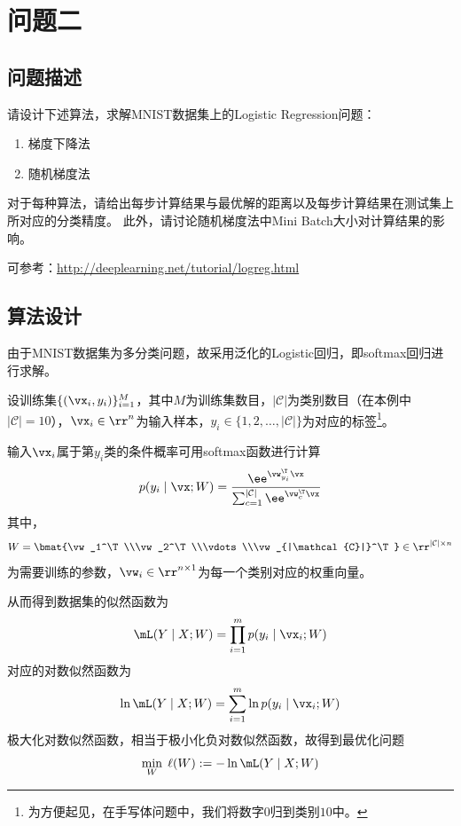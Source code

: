 \documentclass[logo,reportComp]{thesis}
\begin{document}
\section{问题二}
\subsection{问题描述}
请设计下述算法，求解MNIST数据集上的Logistic Regression问题：
\begin{enumerate}
    \item 梯度下降法
    \item 随机梯度法
\end{enumerate}

对于每种算法，请给出每步计算结果与最优解的距离以及每步计算结果在测试集上所对应的分类精度。
此外，请讨论随机梯度法中Mini Batch大小对计算结果的影响。

可参考：\url{http://deeplearning.net/tutorial/logreg.html}


\subsection{算法设计}
由于MNIST数据集为多分类问题，故采用泛化的Logistic回归，即softmax回归进行求解。

设训练集$\{(\vx_i,y_i)\}_{i=1}^M$，其中$M$为训练集数目，${|\mathcal{C}|}$为类别数目（在本例中${|\mathcal{C}|}=10$），$\vx_i\in\rr^n$为输入样本，$y_i\in\{1,2,\ldots,{|\mathcal{C}|}\}$为对应的标签\footnote{为方便起见，在手写体问题中，我们将数字$0$归到类别$10$中。}。

输入$\vx_i$属于第$y_i$类的条件概率可用softmax函数进行计算
\begin{equation}
p(y_i\mid \vx;W)=\frac{\ee^{\vw_{y_i}^\T\vx}}{\sum_{c=1}^{|\mathcal{C}|}\ee^{\vw_c^\T\vx}}
\end{equation}
其中，
\[W=\bmat{\vw_1^\T\\\vw_2^\T\\\vdots\\\vw_{|\mathcal{C}|}^\T}\in\rr^{{|\mathcal{C}|}\times n}\]
为需要训练的参数，$\vw_i\in\rr^{n \times 1}$为每一个类别对应的权重向量。

从而得到数据集的似然函数为
\[\mL(Y\mid X;W)=\prod_{i=1}^m p(y_i\mid\vx_i;W)\]
对应的对数似然函数为
\[\ln\mL(Y\mid X;W)=\sum_{i=1}^m\ln p(y_i\mid\vx_i;W)\]
极大化对数似然函数，相当于极小化负对数似然函数，故得到最优化问题
\begin{equation}
\min_W \;\ell(W):=-\ln\mL(Y\mid X;W)
\end{equation}
\end{document}
